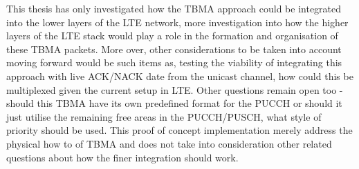 \documentclass{article}
\begin{document}
This thesis has only investigated how the TBMA approach could be integrated into the lower layers of the LTE network, more investigation into how the higher layers of the LTE stack would play a role in the formation and organisation of these TBMA packets. More over, other considerations to be taken into account moving forward would be such items as, testing the viability of integrating this approach with live ACK/NACK date from the unicast channel, how could this be multiplexed given the current setup in LTE. Other questions remain open too - should this TBMA have its own predefined format for the PUCCH or should it just utilise the remaining free areas in the PUCCH/PUSCH, what style of priority should be used. This proof of concept implementation merely address the physical how to of TBMA and does not take into consideration other related questions about how the finer integration should work.






\end{document}
